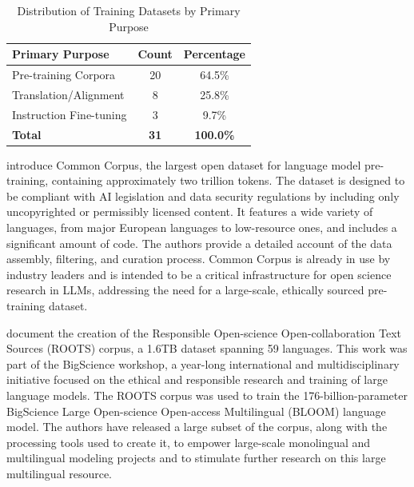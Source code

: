 \documentclass[acmsmall]{acmart}
\begin{document}
\begin{table}[htbp]
\centering
\caption{Distribution of Training Datasets by Primary Purpose}
\label{tab:dataset-purpose}
\begin{tabular}{lcc}
\toprule
\textbf{Primary Purpose} & \textbf{Count} & \textbf{Percentage} \\
\midrule
Pre-training Corpora & 20 & 64.5\% \\
Translation/Alignment & 8 & 25.8\% \\
Instruction Fine-tuning & 3 & 9.7\% \\
\midrule
\textbf{Total} & \textbf{31} & \textbf{100.0\%} \\
\bottomrule
\end{tabular}
\end{table}

\citep{langlais2025commoncorpuslargestcollection} introduce Common Corpus, the largest open dataset for language model pre-training, containing approximately two trillion tokens. The dataset is designed to be compliant with AI legislation and data security regulations by including only uncopyrighted or permissibly licensed content. It features a wide variety of languages, from major European languages to low-resource ones, and includes a significant amount of code. The authors provide a detailed account of the data assembly, filtering, and curation process. Common Corpus is already in use by industry leaders and is intended to be a critical infrastructure for open science research in LLMs, addressing the need for a large-scale, ethically sourced pre-training dataset.

\citep{laurençon2023bigsciencerootscorpus16tb} document the creation of the Responsible Open-science Open-collaboration Text Sources (ROOTS) corpus, a 1.6TB dataset spanning 59 languages. This work was part of the BigScience workshop, a year-long international and multidisciplinary initiative focused on the ethical and responsible research and training of large language models. The ROOTS corpus was used to train the 176-billion-parameter BigScience Large Open-science Open-access Multilingual (BLOOM) language model. The authors have released a large subset of the corpus, along with the processing tools used to create it, to empower large-scale monolingual and multilingual modeling projects and to stimulate further research on this large multilingual resource.
\end{document}
